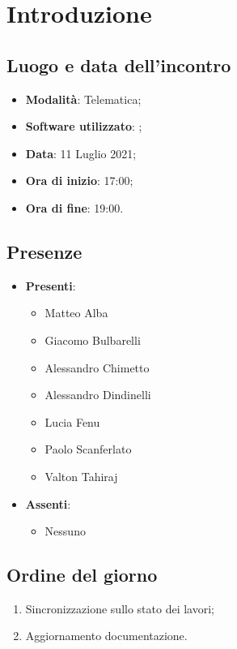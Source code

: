 \documentclass[]{article}
\begin{document}
	

	\newpage


		\section{Introduzione}
		\subsection{Luogo e data dell'incontro}
		\begin{itemize}
			\item \textbf{Modalità}: Telematica;
			\item \textbf{Software utilizzato}: ;
			\item \textbf{Data}: 11 Luglio 2021;
			\item \textbf{Ora di inizio}: 17:00;
			\item \textbf{Ora di fine}: 19:00.
		\end{itemize}

		\subsection{Presenze}
		\begin{itemize}
			\item \textbf{Presenti}:
			\begin{itemize}
				\item Matteo Alba
				\item Giacomo Bulbarelli
				\item Alessandro Chimetto
				\item Alessandro Dindinelli
				\item Lucia Fenu
				\item Paolo Scanferlato
				\item Valton Tahiraj
			\end{itemize}
			\item \textbf{Assenti}:
			\begin{itemize}
				\item Nessuno
			\end{itemize}
		\end{itemize}


		\subsection{Ordine del giorno}
		\begin{enumerate}
			\item Sincronizzazione sullo stato dei lavori;
			\item Aggiornamento documentazione.
		\end{enumerate}
\end{document}
